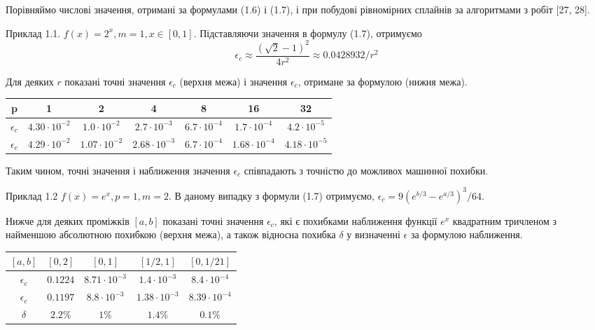 \documentclass[ukrainian,14pt]{extarticle}
\begin{document}
Порівняймо числові значення, отримані за формулами (1.6) і (1.7), і при побудові рівномірних сплайнів за алгоритмами з робіт [27, 28].

Приклад 1.1. $f(x) = 2^x, m = 1, x \in [0, 1]$. Підставляючи значення в формулу (1.7), отримуємо
$$\epsilon_c \approx \frac{(\sqrt{2} - 1)^2}{4r^2} \approx 0.0428932 / r^2$$

Для деяких $r$ показані точні значення $\epsilon_c$ (верхня межа) і значення $\epsilon_c$, отримане за формулою (нижня межа).

\bgroup
\def\arraystretch{1.5}%
\begin{center}
\begin{tabular}{ c | c |
c | c | c | c | c }
 p & 1 & 2 & 4 & 8 & 16 & 32 \\
 \hline
 $\epsilon_c$ & $4.30 \cdot 10^{-2}$ & $1.0 \cdot 10^{-2}$ & $2.7 \cdot 10^{-3}$ & $6.7 \cdot 10^{-4}$ & $1.7 \cdot 10^{-4}$ & $4.2 \cdot 10^{-5}$ \\  
 \hline
 $\epsilon_c$ & $4.29 \cdot 10^{-2}$ & $1.07 \cdot 10^{-2}$ & $2.68 \cdot 10^{-3}$ & $6.7 \cdot 10^{-4}$ & $1.68 \cdot 10^{-4}$ & $4.18 \cdot 10^{-5}$    
\end{tabular}
\end{center}
\egroup

Таким чином, точні значення і наближення значення $\epsilon_c$ співпадають з точністю до можливох машинної похибки.

Приклад 1.2 $f(x) = e^x, p = 1, m = 2$. В даному випадку з формули (1.7) отримуємо, $\epsilon_c = 9 (e^{b/3} - e^{a/3})^3 / 64$.

Нижче для деяких проміжків $[a, b]$ показані точні значення $\epsilon_c$, які є похибками наближення функції $e^x$ квадратним тричленом з найменшою абсолютною похибкою (верхня межа), а також відносна похибка $\delta$ у визначенні $\epsilon$ за формулою наближення.

\bgroup
\def\arraystretch{1.5}%
\begin{center}
\begin{tabular}{ c | c |
c | c | c }
 $[a, b]$ & $[0,2]$ & $[0,1]$ & $[1/2,1]$ & $[0,1/21]$ \\
 \hline
 $\epsilon_c$ & $0.1224$ & $8.71 \cdot 10^{-3}$ & $1.4 \cdot 10^{-3}$ & $8.4 \cdot 10^{-4}$ \\  
 \hline
  $\epsilon_c$ & $0.1197$ & $8.8 \cdot 10^{-3}$ & $1.38 \cdot 10^{-3}$ & $8.39 \cdot 10^{-4}$\\  
 \hline
 $\delta$ & $2.2\%$ & $1\%$ & $1.4\%$ & $0.1\%$    
\end{tabular}
\end{center}
\egroup
\end{document}
